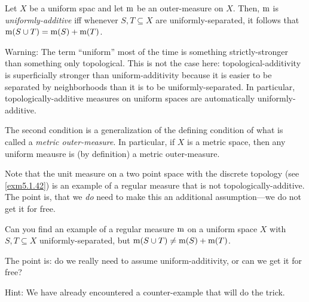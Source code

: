 \begin{dfn}\label{UniformAdditivity}
Let $X$ be a uniform spac and let $\mathrm{m}$ be an outer-measure on $X$.  Then, $\mathrm{m}$ is \emph{uniformly-additive} iff whenever $S,T\subseteq X$ are uniformly-separated, it follows that $\mathrm{m} (S\cup T)=\mathrm{m} (S)+\mathrm{m} (T)$.
\begin{rmk}
Warning:  The term ``uniform'' most of the time is something strictly-stronger than something only topological.  This is not the case here:  topological-additivity is superficially stronger than uniform-additivity because it is easier to be separated by neighborhoods than it is to be uniformly-separated.  In particular, topologically-additive measures on uniform spaces are automatically uniformly-additive.
\end{rmk}
\begin{rmk}
The second condition is a generalization of the defining condition of what is called a \emph{metric outer-measure}.  In particular, if $X$ is a metric space, then any uniform meausre is (by definition) a metric outer-measure.
\end{rmk}
\begin{rmk}
Note that the unit measure on a two point space with the discrete topology (see \cref{exm5.1.42}) is an example of a regular measure that is not topologically-additive.  The point is, that we \emph{do} need to make this an additional assumption---we do not get it for free.
\end{rmk}
\end{dfn}
\begin{exr}
Can you find an example of a regular measure $\mathrm{m}$ on a uniform space $X$ with $S,T\subseteq X$ uniformly-separated, but $\mathrm{m} (S\cup T)\neq \mathrm{m} (S)+\mathrm{m} (T)$.
\begin{rmk}
The point is:  do we really need to assume uniform-additivity, or can we get it for free?
\end{rmk}
\begin{rmk}
Hint:  We have already encountered a counter-example that will do the trick.
\end{rmk}
\end{exr}
